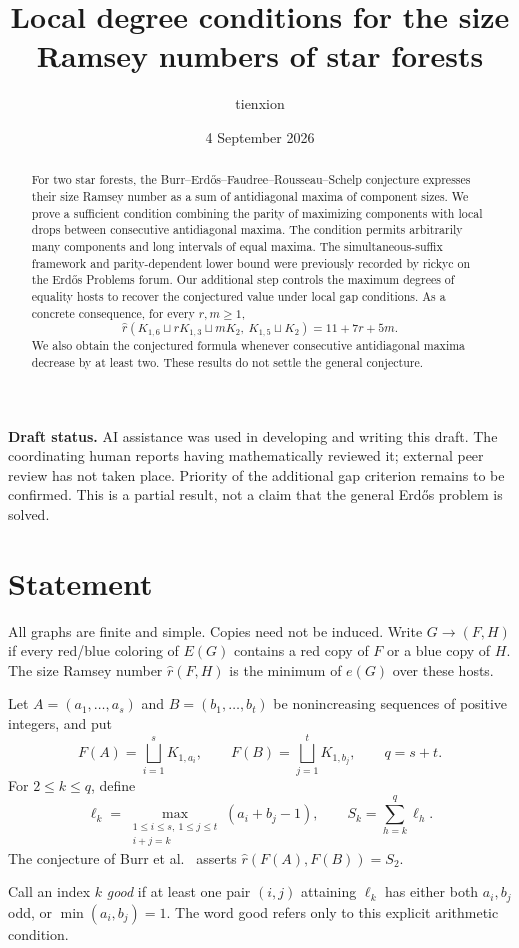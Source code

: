 \documentclass[11pt]{article}
\title{Local degree conditions for the size Ramsey numbers of star forests}
\author{tienxion}
\date{4 September 2026}
\theoremstyle{remark}\newtheorem{remark}[theorem]{Remark}
\newcommand{\sr}{\widehat r}
\newcommand{\sq}{\sqcup}
\begin{document}
\maketitle
\begin{abstract}
For two star forests, the Burr--Erd\H{o}s--Faudree--Rousseau--Schelp conjecture expresses their size Ramsey number as a sum of antidiagonal maxima of component sizes. We prove a sufficient condition combining the parity of maximizing components with local drops between consecutive antidiagonal maxima. The condition permits arbitrarily many components and long intervals of equal maxima. The simultaneous-suffix framework and parity-dependent lower bound were previously recorded by rickyc on the Erd\H{o}s Problems forum. Our additional step controls the maximum degrees of equality hosts to recover the conjectured value under local gap conditions. As a concrete consequence, for every $r,m\ge1$,
\[
\sr(K_{1,6}\sq rK_{1,3}\sq mK_2,\ K_{1,5}\sq K_2)=11+7r+5m.
\]
We also obtain the conjectured formula whenever consecutive antidiagonal maxima decrease by at least two. These results do not settle the general conjecture.
\end{abstract}

\noindent\textbf{Draft status.} AI assistance was used in developing and writing this draft. The coordinating human reports having mathematically reviewed it; external peer review has not taken place. Priority of the additional gap criterion remains to be confirmed. This is a partial result, not a claim that the general Erd\H{o}s problem is solved.

\section{Statement}
All graphs are finite and simple. Copies need not be induced. Write $G\to(F,H)$ if every red/blue coloring of $E(G)$ contains a red copy of $F$ or a blue copy of $H$. The size Ramsey number $\sr(F,H)$ is the minimum of $e(G)$ over these hosts.

Let $A=(a_1,\ldots,a_s)$ and $B=(b_1,\ldots,b_t)$ be nonincreasing sequences of positive integers, and put
\[
 F(A)=\bigsqcup_{i=1}^sK_{1,a_i},\qquad
 F(B)=\bigsqcup_{j=1}^tK_{1,b_j},\qquad q=s+t.
\]
For $2\le k\le q$, define
\[
 \ell_k=\max_{\substack{1\le i\le s,\ 1\le j\le t\\i+j=k}}
 (a_i+b_j-1),\qquad S_k=\sum_{h=k}^q\ell_h.
\]
The conjecture of Burr et al.~\cite{BEFRS} asserts $\sr(F(A),F(B))=S_2$.

Call an index $k$ \emph{good} if at least one pair $(i,j)$ attaining $\ell_k$ has either both $a_i,b_j$ odd, or $\min(a_i,b_j)=1$. The word good refers only to this explicit arithmetic condition.
\end{document}
